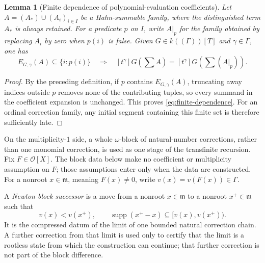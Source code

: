 \documentclass[11pt]{article}
\newcommand{\Val}{v}
\newcommand{\Supp}{\operatorname{supp}}
\newcommand{\Ocal}{\mathcal O}
\theoremstyle{proofnote}
\newtheorem{lemma}[theorem]{Lemma}
\begin{document}
\begin{lemma}[Finite dependence of polynomial-evaluation coefficients]
\label{lem:ordinal-eval-finite}
  Let \(A=(A_*)\cup(A_i)_{i\in I}\) be a Hahn-summable family, where the
  distinguished term \(A_*\) is always retained.  For a predicate
  \(p\) on \(I\), write \(A|_p\) for the family obtained by replacing
  \(A_i\) by zero when \(p(i)\) is false.  Given
  \(G\in k((\Gamma))[T]\) and \(\gamma\in\Gamma\), one has
  \[
    E_{G,\gamma}(A)\subseteq\{i:p(i)\}
    \quad\Longrightarrow\quad
    [t^\gamma]G\!\left(\sum A\right)
      =[t^\gamma]G\!\left(\sum(A|_p)\right).
    \tag{FD}\label{eq:finite-dependence}
  \]
\end{lemma}
\begin{proof}
  By the preceding definition, if \(p\) contains
  \(E_{G,\gamma}(A)\), truncating away indices outside
  \(p\) removes none of the contributing tuples, so every summand in the
  coefficient expansion is unchanged.  This proves
  \eqref{eq:finite-dependence}.  For an ordinal correction family, any
  initial segment containing this finite set is therefore sufficiently late.
\end{proof}

On the multiplicity-\(1\) side, a whole \(\omega\)-block of natural-number
corrections, rather than one monomial correction, is used as one
stage of the transfinite recursion.  Fix \(F\in\Ocal[X]\).  The block data
below make no coefficient or multiplicity assumption on \(F\); those
assumptions enter only when the data are constructed.  For a nonroot
\(x\in\mathfrak m\), meaning \(F(x)\ne0\), write
\(v(x)=\Val(F(x))\in\Gamma\).

A \emph{Newton block successor} is a move from a nonroot
\(x\in\mathfrak m\) to a nonroot \(x^+\in\mathfrak m\) such that
  \[
    v(x)<v(x^+),\qquad
    \Supp(x^+-x)\subseteq [v(x),v(x^+)).
  \]
It is the compressed datum of the limit of one bounded natural correction
chain.  A further correction from that limit is used only to certify that the
limit is a rootless state from which the construction can continue; that
further correction is not part of the block difference.
\end{document}
